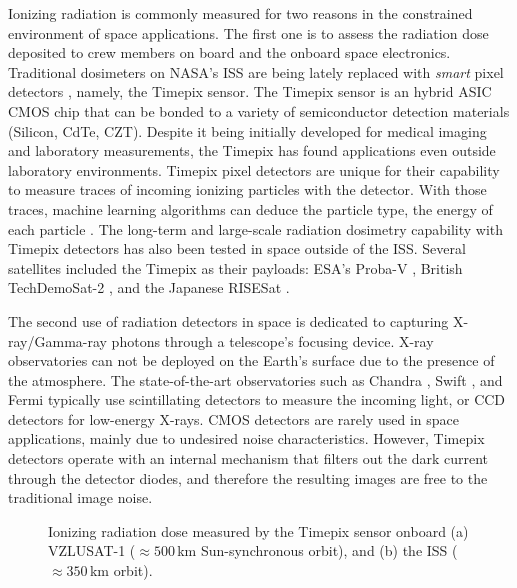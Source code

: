 \documentclass[a4paper,11pt,twoside,openright]{book}
\begin{document}
Ionizing radiation is commonly measured for two reasons in the constrained environment of space applications.
The first one is to assess the radiation dose deposited to crew members on board and the onboard space electronics.
Traditional dosimeters on NASA's \ac{ISS} are being lately replaced with \emph{smart} pixel detectors \cite{turecek2011small, stoffle2015timepix, pinsky2019timepix}, namely, the Timepix sensor.
The Timepix sensor \cite{llopart2007timepix, poikela2014timepix3} is an hybrid \ac{ASIC} \ac{CMOS} chip that can be bonded to a variety of semiconductor detection materials (Silicon, \acs{CdTe}, \acs{CZT}).
Despite it being initially developed for medical imaging \cite{ballabriga2018asic} and laboratory measurements, the Timepix has found applications even outside laboratory environments.
Timepix pixel detectors are unique for their capability to measure traces of incoming ionizing particles with the detector.
With those traces, machine learning algorithms can deduce the particle type, the energy of each particle \cite{granja2018resolving, baca2019timepix}.
The long-term and large-scale radiation dosimetry capability with Timepix detectors has also been tested in space outside of the \ac{ISS}.
Several satellites included the Timepix as their payloads: ESA's Proba-V \cite{granja2014directional, granja2016satram}, British TechDemoSat-2 \cite{furnell2018first}, and the Japanese RISESat \cite{filgas2019risepix}.

The second use of radiation detectors in space is dedicated to capturing X-ray/Gamma-ray photons through a telescope's focusing device.
X-ray observatories can not be deployed on the Earth's surface due to the presence of the atmosphere.
The state-of-the-art observatories such as Chandra \cite{weisskopf2000chandra}, Swift \cite{gehrels2004swift}, and Fermi \cite{atwood2009large} typically use scintillating detectors to measure the incoming light, or \acs{CCD} detectors for low-energy X-rays.
\ac{CMOS} detectors are rarely used in space applications, mainly due to undesired noise characteristics.
However, Timepix detectors operate with an internal mechanism that filters out the dark current through the detector diodes, and therefore the resulting images are free to the traditional image noise.


\begin{figure}[!h]
  \centering
  \caption{Ionizing radiation dose measured by the Timepix sensor onboard (a) VZLUSAT-1 ($\approx 500$\,km Sun-synchronous orbit), and (b) the \acl{ISS} ($\approx 350$\,km orbit).}
  \label{fig:intro_radiation_maps}
\end{figure}
\end{document}
